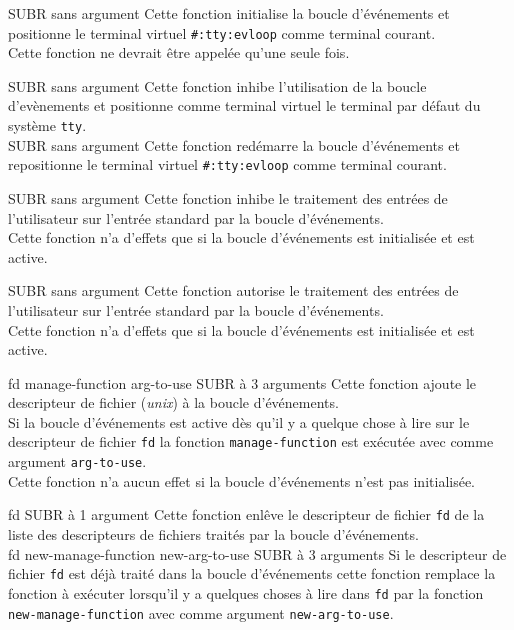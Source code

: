  {} {SUBR sans argument}
Cette fonction initialise la boucle d'\'{e}v\'{e}nements et positionne
le terminal virtuel {\tt \#:tty:evloop} comme terminal courant.\\
Cette fonction ne devrait \^{e}tre appel\'{e}e qu'une seule fois.

 {} {SUBR sans argument}
Cette fonction inhibe l'utilisation de la boucle d'ev\`{e}nements et positionne
comme terminal virtuel le terminal par d\'{e}faut du syst\`{e}me {\tt tty}.\\

 {} {SUBR sans argument}
Cette fonction red\'{e}marre la boucle d'\'{e}v\'{e}nements et repositionne
le terminal virtuel {\tt \#:tty:evloop} comme terminal courant.

 {} {SUBR sans argument}
Cette fonction inhibe le traitement des entr\'{e}es de l'utilisateur sur
l'entr\'{e}e standard par la boucle d'\'{e}v\'{e}nements.\\
Cette fonction n'a d'effets que si la boucle d'\'{e}v\'{e}nements est 
initialis\'{e}e et est active.


 {} {SUBR sans argument}
Cette fonction autorise le traitement des entr\'{e}es de l'utilisateur sur
l'entr\'{e}e standard par la boucle d'\'{e}v\'{e}nements.\\
Cette fonction n'a d'effets que si la boucle d'\'{e}v\'{e}nements est 
initialis\'{e}e et est active.

 {fd manage-function arg-to-use} {SUBR \`{a} 3 arguments}
Cette fonction ajoute le descripteur de fichier ({\em unix}) \`{a} la boucle
d'\'{e}v\'{e}nements.\\
Si la boucle d'\'{e}v\'{e}nements est active d\`{e}s qu'il y a quelque chose \`{a}
lire sur le descripteur de fichier {\tt fd} la fonction
{\tt manage-function} est ex\'{e}cut\'{e}e avec comme argument {\tt arg-to-use}.\\
Cette fonction n'a aucun effet si la boucle d'\'{e}v\'{e}nements n'est pas 
initialis\'{e}e.

 {fd} {SUBR \`{a} 1 argument}
Cette fonction enl\^{e}ve  le descripteur de fichier {\tt fd} de la liste
des descripteurs de fichiers trait\'{e}s par la boucle d'\'{e}v\'{e}nements.\\

 {fd new-manage-function new-arg-to-use} {SUBR \`{a} 3 arguments}
Si le descripteur de fichier {\tt fd} est d\'{e}j\`{a} trait\'{e} dans la boucle
d'\'{e}v\'{e}nements cette fonction remplace la fonction \`{a} ex\'{e}cuter 
lorsqu'il y a quelques choses \`{a} lire dans {\tt fd} par la fonction
{\tt new-manage-function} avec comme argument {\tt new-arg-to-use}.

